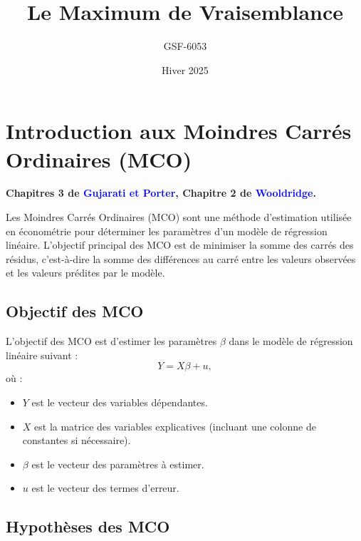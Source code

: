 \documentclass[14pt]{extarticle} %
\title{\textbf{Le Maximum de Vraisemblance}}
\author{GSF-6053}
\date{Hiver 2025}
\newcommand{\livre}[1]{\textcolor{blue}{#1}}
\begin{document}
\maketitle

\tableofcontents
\newpage

\onehalfspacing

\section{Introduction aux Moindres Carrés Ordinaires (MCO)}

\textbf{Chapitres 3 de \livre{Gujarati et Porter}, Chapitre 2 de \livre{Wooldridge}.}

Les Moindres Carrés Ordinaires (MCO) sont une méthode d'estimation utilisée en économétrie pour déterminer les paramètres d'un modèle de régression linéaire. L'objectif principal des MCO est de minimiser la somme des carrés des résidus, c'est-à-dire la somme des différences au carré entre les valeurs observées et les valeurs prédites par le modèle.

\subsection{Objectif des MCO}

L'objectif des MCO est d'estimer les paramètres \(\beta\) dans le modèle de régression linéaire suivant :
\begin{equation*}
Y = X\beta + u,
\end{equation*}
où :
\begin{itemize}
    \item \(Y\) est le vecteur des variables dépendantes.
    \item \(X\) est la matrice des variables explicatives (incluant une colonne de constantes si nécessaire).
    \item \(\beta\) est le vecteur des paramètres à estimer.
    \item \(u\) est le vecteur des termes d'erreur.
\end{itemize}

\subsection{Hypothèses des MCO}
\end{document}
